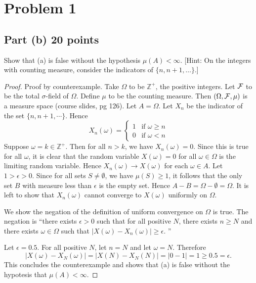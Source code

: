 \documentclass[letterpaper, 12pt]{article}
\newcommand{\Fc}{{\cal F}}
\newcommand{\Z}{\mathbb{Z}}
\begin{document}
\pagebreak

\section*{Problem 1}
\subsection*{Part (b) 20 points}
Show that (a) is false without the hypothesis $\mu(A) < \infty$.  
[{\sc Hint:} On the integers with counting measure, consider the indicators of $\{n, n+1, \ldots\}$.]   

\begin{proof}
Proof by counterexample. 
Take $\Omega$ to be $\Z^+$, the positive integers. Let $\Fc$ to be the total $\sigma$-field of $\Omega$. Define $\mu$ to be the counting measure. Then $(\Omega, \Fc, \mu)$ is a measure space (course slides, pg 126). Let $A = \Omega$. Let $X_n$ be the indicator of the set $\{n, n+1, \cdots\}$. Hence
\[
X_n(\omega) = 
\begin{cases}
1 & \text{if $\omega \geq n$} \\
0 & \text{if $\omega < n$}
\end{cases}
\]
Suppose $\omega = k \in \Z^+$. Then for all $n > k$, we have $X_n(\omega) = 0$. Since this is true for all $\omega$, it is clear that the random variable $X(\omega) = 0$ for all $\omega \in \Omega$ is the limiting random variable. 
Hence $X_n(\omega) \to X(\omega)$ for each $\omega \in A$. 
Let $1 > \epsilon > 0$. Since for all sets $S \neq \emptyset$, we have $\mu (S) \geq 1$, it follows that the only set $B$ with measure less than $\epsilon$ is the empty set. Hence $A - B = \Omega - \emptyset = \Omega$. 
It is left to show that $X_n(\omega)$ cannot converge to $X(\omega)$ uniformly on $\Omega$.

We show the negation of the definition of uniform convergence on $\Omega$ is true. The negation is ``there exists $\epsilon > 0$ such that for all positive $N$, there exists $n \geq N$ and there exists $\omega \in \Omega$ such that $|X(\omega) - X_n(\omega)| \geq \epsilon$. ''

Let $\epsilon = 0.5$. For all positive $N$, let $n = N$ and let $\omega = N$. Therefore
\[
|X(\omega) - X_N(\omega)| = |X(N) - X_N(N)| = |0 - 1| = 1 \geq 0.5 = \epsilon
\text{.}
\]
This concludes the counterexample and shows that (a) is false without the hypotesis that $\mu(A) < \infty$.
\end{proof}

\pagebreak
\end{document}
